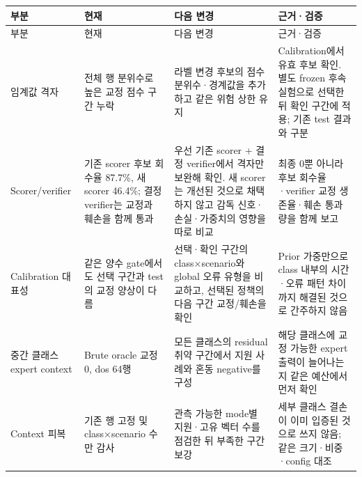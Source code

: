 \begingroup
\footnotesize
\begin{longtable}{>{\raggedright\arraybackslash}p{}>{\raggedright\arraybackslash}p{}>{\raggedright\arraybackslash}p{}>{\raggedright\arraybackslash}p{}}
\toprule
부분 & 현재 & 다음 변경 & 근거·검증 \\ \midrule
\endfirsthead
부분 & 현재 & 다음 변경 & 근거·검증 \\ \midrule
\endhead
{}임계값 격자 & 전체 행 분위수로 높은 교정 점수 구간 누락 & 라벨 변경 후보의 점수 분위수·경계값을 추가하고 같은 위험 상한 유지 & Calibration에서 유효 후보 확인. 별도 frozen 후속 실험으로 선택한 뒤 확인 구간에 적용; 기존 test 결과와 구분 \\
{}Scorer/\allowbreak{}verifier & 기존 scorer 후보 회수율 87.7\%, 새 scorer 46.4\%; 결정 verifier는 교정과 훼손을 함께 통과 & 우선 기존 scorer +\allowbreak{} 결정 verifier에서 격자만 보완해 확인. 새 scorer는 개선된 것으로 채택하지 않고 감독 신호·손실·가중치의 영향을 따로 비교 & 최종 0뿐 아니라 후보 회수율·verifier 교정 생존율·훼손 통과량을 함께 보고 \\
{}Calibration 대표성 & 같은 양수 gate에서도 선택 구간과 test의 교정 양상이 다름 & 선택·확인 구간의 class×scenario와 global 오류 유형을 비교하고, 선택된 정책의 다음 구간 교정/\allowbreak{}훼손을 확인 & Prior 가중만으로 class 내부의 시간·오류 패턴 차이까지 해결된 것으로 간주하지 않음 \\
{}중간 클래스 expert context & Brute oracle 교정 0, dos 64행 & 모든 클래스의 residual 취약 구간에서 지원 사례와 혼동 negative를 구성 & 해당 클래스에 교정 가능한 expert 출력이 늘어나는지 같은 예산에서 먼저 확인 \\
{}Context 피복 & 기존 행 고정 및 class×scenario 수만 감사 & 관측 가능한 mode별 지원·고유 벡터 수를 점검한 뒤 부족한 구간 보강 & 세부 클래스 결손이 이미 입증된 것으로 쓰지 않음; 같은 크기·비중·config 대조 \\
\bottomrule
\end{longtable}
\endgroup
\begingroup
\footnotesize
